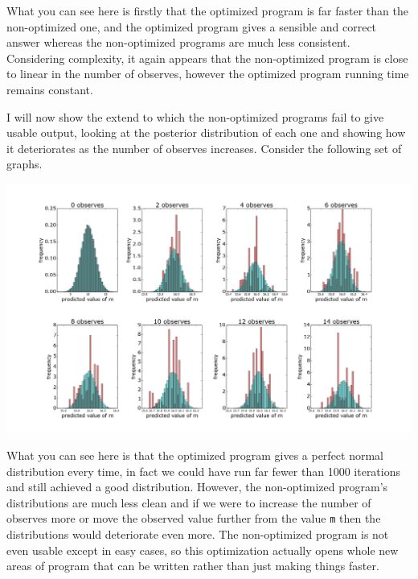 \documentclass[a4paper]{article}
\begin{document}
What you can see here is firstly that the optimized program is far faster than the non-optimized one, and the optimized program gives a sensible and correct answer whereas the non-optimized programs are much less consistent. Considering complexity, it again appears that the non-optimized program is close to linear in the number of observes, however the optimized program running time remains constant.

I will now show the extend to which the non-optimized programs fail to give usable output, looking at the posterior distribution of each one and showing how it deteriorates as the number of observes increases. Consider the following set of graphs.

\centerline{\includegraphics[width=16cm]{images/removing_observes_2.png}}

What you can see here is that the optimized program gives a perfect normal distribution every time, in fact we could have run far fewer than 1000 iterations and still achieved a good distribution. However, the non-optimized program's distributions are much less clean and if we were to increase the number of observes more or move the observed value further from the value \texttt{m} then the distributions would deteriorate even more. The non-optimized program is not even usable except in easy cases, so this optimization actually opens whole new areas of program that can be written rather than just making things faster.
\end{document}
